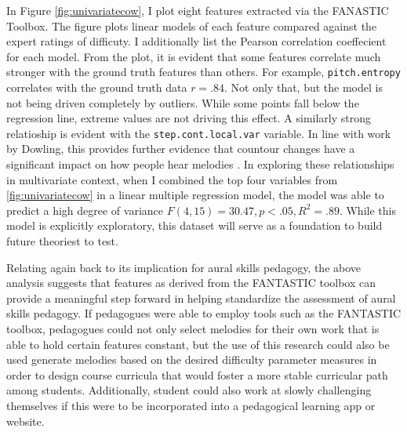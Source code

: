 \documentclass[]{book}
\begin{document}
In Figure \ref{fig:univariatecow}, I plot eight features extracted via the FANASTIC Toolbox.
The figure plots linear models of each feature compared against the expert ratings of difficuty.
I additionally list the Pearson correlation coeffecient for each model.
From the plot, it is evident that some features correlate much stronger with the ground truth features than others.
For example, \texttt{pitch.entropy} correlates with the ground truth data \(r = .84\).
Not only that, but the model is not being driven completely by outliers.
While some points fall below the regression line, extreme values are not driving this effect.
A similarly strong relatioship is evident with the \texttt{step.cont.local.var} variable.
In line with work by Dowling, this provides further evidence that countour changes have a significant impact on how people hear melodies \citep{dowlingScaleContourTwo1978}.
In exploring these relationships in multivariate context, when I combined the top four variables from \ref{fig:univariatecow} in a linear multiple regression model, the model was able to predict a high degree of variance \(F(4,15) = 30.47, p < .05, R^2 = .89\).
While this model is explicitly exploratory, this dataset will serve as a foundation to build future theoriest to test.

Relating again back to its implication for aural skills pedagogy, the above analysis suggests that features as derived from the FANTASTIC toolbox can provide a meaningful step forward in helping standardize the assessment of aural skills pedagogy.
If pedagogues were able to employ tools such as the FANTASTIC toolbox, pedagogues could not only select melodies for their own work that is able to hold certain features constant, but the use of this research could also be used generate melodies based on the desired difficulty parameter measures in order to design course curricula that would foster a more stable curricular path among students.
Additionally, student could also work at slowly challenging themselves if this were to be incorporated into a pedagogical learning app or website.
\end{document}
